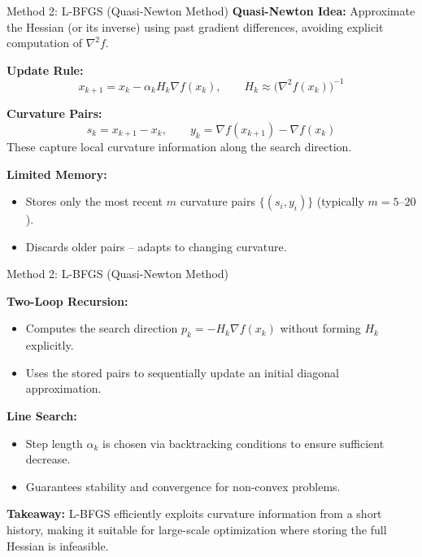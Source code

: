 \documentclass[aspectratio=169,usenames,dvipsnames]{beamer}
\begin{document}
\begin{frame}{Method 2: L-BFGS (Quasi-Newton Method)}
    \textbf{Quasi-Newton Idea:} Approximate the Hessian (or its inverse) using past gradient differences, avoiding explicit computation of \(\nabla^2 f\).

    \vspace{0.2cm}
    \textbf{Update Rule:}
    \[
    x_{k+1} = x_k - \alpha_k H_k \nabla f(x_k),
    \qquad H_k \approx \bigl(\nabla^2 f(x_k)\bigr)^{-1}
    \]

    \vspace{0.2cm}
    \textbf{Curvature Pairs:} 
    \[
    s_k = x_{k+1} - x_k, \qquad
    y_k = \nabla f(x_{k+1}) - \nabla f(x_k)
    \]
    These capture local curvature information along the search direction.

\vspace{0.2cm}
    \textbf{Limited Memory:}
    \begin{itemize}
        \item Stores only the most recent \(m\) curvature pairs \(\{(s_i, y_i)\}\) (typically \(m = 5\)–\(20\)).
        \item Discards older pairs – adapts to changing curvature.
    \end{itemize}
\end{frame}










\begin{frame}{Method 2: L-BFGS (Quasi-Newton Method)}

    \vspace{0.2cm}
    \textbf{Two-Loop Recursion:}
    \begin{itemize}
        \item Computes the search direction \(p_k = -H_k \nabla f(x_k)\) without forming \(H_k\) explicitly.
        \item Uses the stored pairs to sequentially update an initial diagonal approximation.
    \end{itemize}

    \vspace{0.2cm}
    \textbf{Line Search:}
    \begin{itemize}
        \item Step length \(\alpha_k\) is chosen via backtracking conditions to ensure sufficient decrease.
        \item Guarantees stability and convergence for non-convex problems.
    \end{itemize}

    \vspace{0.2cm}
    \textbf{Takeaway:} L-BFGS efficiently exploits curvature information from a short history, making it suitable for large-scale optimization where storing the full Hessian is infeasible.
\end{frame}
\end{document}
